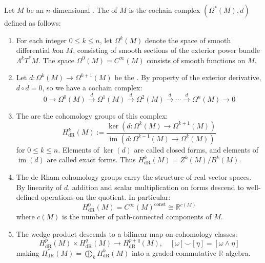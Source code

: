 \begin{definition} \label{definition:de_rham_cohomology_of_a_smooth_manifold}

Let $M$ be an $n$-dimensional . The  of $M$ is the cochain complex $(\Omega^*(M), d)$ defined as follows:

\begin{enumerate}
    \item For each integer $0 \leq k \leq n$, let $\Omega^k(M)$ denote the space of smooth differential $k$\hypformulas on $M$, consisting of smooth sections of the exterior power bundle $\Lambda^k T^*M$. The space $\Omega^0(M) = C^\infty(M)$ consists of smooth functions on $M$.

    \item Let $d: \Omega^k(M) \to \Omega^{k+1}(M)$ be the . By property of the exterior derivative, $d \circ d = 0$, so we have a cochain complex:
    $$ 0 \to \Omega^0(M) \xrightarrow{\ d\ } \Omega^1(M) \xrightarrow{\ d\ } \Omega^2(M) \xrightarrow{\ d\ } \cdots \xrightarrow{\ d\ } \Omega^n(M) \to 0 $$

    \item The  are the cohomology groups of this complex:
    $$ H^k_{\mathrm{dR}}(M) := \frac{\ker(d: \Omega^k(M) \to \Omega^{k+1}(M))}{\operatorname{im}(d: \Omega^{k-1}(M) \to \Omega^k(M))} $$
    for $0 \leq k \leq n$. Elements of $\ker(d)$ are called closed forms, and elements of $\operatorname{im}(d)$ are called exact forms. Thus $H^k_{\mathrm{dR}}(M) = Z^k(M) / B^k(M)$.

    \item The de Rham cohomology groups carry the structure of real vector spaces. By linearity of $d$, addition and scalar multiplication on forms descend to well-defined operations on the quotient. In particular:
    $$ H^0_{\mathrm{dR}}(M) = C^\infty(M)^{\operatorname{const}} \cong \mathbb{R}^{c(M)} $$
    where $c(M)$ is the number of path-connected components of $M$.

    \item The wedge product descends to a bilinear map on cohomology classes:
    $$ H^p_{\mathrm{dR}}(M) \times H^q_{\mathrm{dR}}(M) \to H^{p+q}_{\mathrm{dR}}(M), \quad [\omega] \smile [\eta] = [\omega \wedge \eta] $$
    making $H^*_{\mathrm{dR}}(M) = \bigoplus_k H^k_{\mathrm{dR}}(M)$ into a graded-commutative $\mathbb{R}$-algebra.


\end{enumerate}
\end{definition}
